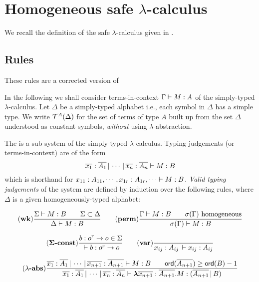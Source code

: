 \section{Homogeneous safe $\lambda$-calculus}
\label{sec:safe_alt}

We recall the definition of the safe $\lambda$-calculus given in
\cite{Ong2005}.

\subsection{Rules}

These rules are a corrected version of
\cite{DBLP:conf/fossacs/AehligMO05}

In the following we shall consider terms-in-context ${{\Gamma} \vdash {M
: A}}$ of the simply-typed $\lambda$-calculus. Let $\Delta$ be a
simply-typed alphabet i.e., each symbol in $\Delta$ has a simple
type. We write ${\cal T}^{A}(\Delta)$ for the set of terms of type $A$
built up from the set $\Delta$ understood as constant symbols,
\emph{without} using $\lambda$-abstraction.


The  is a sub-system of the
simply-typed $\lambda$-calculus. Typing judgements (or
terms-in-context) are of the form
\begin{equation}
\nonumber {{\overline{x_1}:\overline{A_1} \, | \, \cdots \, | \,
\overline{x_n} :  \overline{A_n}} \vdash {M : B}}
\end{equation}
which is shorthand for ${{x_{11} : A_{11}, \cdots, x_{1r}:
A_{1r}, \cdots} \vdash {M : B}}$. \emph{Valid typing judgements} of the
system are defined by induction over the following rules, where
$\Delta$ is a given homogeneously-typed alphabet:

$$ \mathbf{(wk)}
    {   \frac{\displaystyle  {{\Sigma} \vdash {M:B}} \qquad {\Sigma \subset \Delta} }{ {{\Delta } \vdash {M : B}}}
   }
\qquad
    \mathbf{(perm)}
    {
      \frac{\displaystyle  {{\Gamma} \vdash {M:B}} \qquad \sigma(\Gamma) \hbox{ homogeneous} }{ {{\sigma(\Gamma)} \vdash {M : B}} }
    }
$$


$$ \mathbf{(\Sigma\mbox{\textbf{-const}})}  \frac{\displaystyle b : o^r \rightarrow o \in \Sigma}{{{} \vdash {b : o^r \rightarrow o}}}
\qquad
 \mathbf{(var)} \frac{\displaystyle }{{{x_{ij} : A_{ij}\, } \vdash {x_{ij} : A_{ij}}}}
$$

$$ \mathbf{(\lambda\mbox{\textbf{-abs}})}
\frac{\displaystyle  {{{\overline{x_1} : \overline{A_1}\, | \, \cdots\, | \,
\overline{x_{n+1}} : \overline{A_{n+1}}} \vdash {M : B}}} \qquad
{\sf ord}(\overline{A_{n+1}}) \geq {\sf ord}(B) -1}{{{\overline{x_1} :
\overline{A_1}\, | \, \cdots\, | \, \overline{x_{n}} :
\overline{A_{n}}} \vdash {{\hbox{\boldmath $\lambda$}{\overline{x_{n+1}} : \overline{A_{n+1}}}.{M}}
: (\overline{A_{n+1}} \, | \, B)}}} $$


